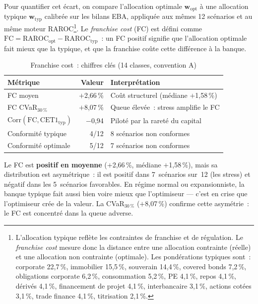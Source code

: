 \documentclass[10pt, a4paper, oneside]{report}
\theoremstyle{definition}
\begin{document}
Pour quantifier cet écart, on compare l'allocation optimale $\mathbf{w}_{\text{opt}}$ à une allocation typique $\mathbf{w}_{\text{typ}}$ calibrée sur les bilans EBA, appliquée aux mêmes 12 scénarios et au même moteur RAROC\footnote{L'allocation typique reflète les contraintes de franchise et de régulation. Le \emph{franchise cost} mesure donc la distance entre une allocation contrainte (réelle) et une allocation non contrainte (optimale). Les pondérations typiques sont~: corporate 22{,}7\,\%, immobilier 15{,}5\,\%, souverain 14{,}4\,\%, covered bonds 7{,}2\,\%, obligations corporate 6{,}2\,\%, consommation 5{,}2\,\%, PE 4{,}1\,\%, repos 4{,}1\,\%, dérivés 4{,}1\,\%, financement de projet 4{,}1\,\%, interbancaire 3{,}1\,\%, actions cotées 3{,}1\,\%, trade finance 4{,}1\,\%, titrisation 2{,}1\,\%.}. Le \emph{franchise cost} (FC) est défini comme $\text{FC} = \text{RAROC}_{\text{opt}} - \text{RAROC}_{\text{typ}}$~: un FC positif signifie que l'allocation optimale fait mieux que la typique, et que la franchise coûte cette différence à la banque.

\begin{table}[htbp]
\centering
\caption{Franchise cost~: chiffres clés (14 classes, convention A)}
\label{tab:fc-cles}
\small
\begin{tabular}{lrl}
\toprule
Métrique & Valeur & Interprétation \\
\midrule
FC moyen & $+$2{,}66\,\% & Coût structurel (médiane $+$1{,}58\,\%) \\
FC CVaR$_{30\,\%}$ & $+$8{,}07\,\% & Queue élevée~: stress amplifie le FC \\
$\text{Corr}(\text{FC}, \text{CET1}_{\text{typ}})$ & $-$0{,}94 & Piloté par la rareté du capital \\
Conformité typique & 4/12 & 8 scénarios non conformes \\
Conformité optimale & 5/12 & 7 scénarios non conformes \\
\bottomrule
\end{tabular}
\end{table}

Le FC est \textbf{positif en moyenne} ($+$2{,}66\,\%, médiane $+$1{,}58\,\%), mais sa distribution est asymétrique~: il est positif dans 7~scénarios sur~12 (les stress) et négatif dans les 5~scénarios favorables. En régime normal ou expansionniste, la banque typique fait aussi bien voire mieux que l'optimiseur --- c'est en crise que l'optimiseur crée de la valeur. La CVaR$_{30\,\%}$ ($+$8{,}07\,\%) confirme cette asymétrie~: le FC est concentré dans la queue adverse.
\end{document}
